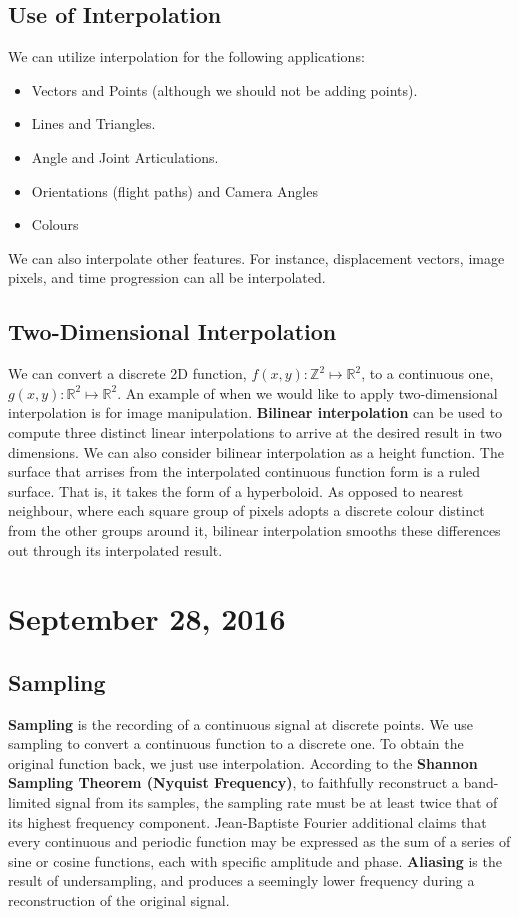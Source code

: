 \documentclass[11pt]{article}
\theoremstyle{plain} %
\theoremstyle{definition}
\theoremstyle{example}
\theoremstyle{remark}
\begin{document}
\subsection{Use of Interpolation}

We can utilize interpolation for the following applications:

\begin{itemize}
	\item Vectors and Points (although we should not be adding points).
	\item Lines and Triangles.
	\item Angle and Joint Articulations.
	\item Orientations (flight paths) and Camera Angles
	\item Colours
\end{itemize}

We can also interpolate other features. For instance, displacement vectors, image pixels, and time progression can all be interpolated. 

\subsection{Two-Dimensional Interpolation}

We can convert a discrete 2D function, $f(x,y):\mathbb Z^2 \mapsto \mathbb R^2$, to a continuous one, $g(x,y):\mathbb R^2 \mapsto \mathbb R^2$. An example of when we would like to apply two-dimensional interpolation is for image manipulation. \textbf{Bilinear interpolation} can be used to compute three distinct linear interpolations to arrive at the desired result in two dimensions. We can also consider bilinear interpolation as a height function. The surface that arrises from the interpolated continuous function form is a ruled surface. That is, it takes the form of a hyperboloid. As opposed to nearest neighbour, where each square group of pixels adopts a discrete colour distinct from the other groups around it, bilinear interpolation smooths these differences out through its interpolated result.

\section{September 28, 2016}
\subsection{Sampling}
\textbf{Sampling} is the recording of a continuous signal at discrete points. We use sampling to convert a continuous function to a discrete one. To obtain the original function back, we just use interpolation. According to the \textbf{Shannon Sampling Theorem (Nyquist Frequency)}, to faithfully reconstruct a band-limited signal from its samples, the sampling rate must be at least twice that of its highest frequency component. Jean-Baptiste Fourier additional claims that every continuous and periodic function may be expressed as the sum of a series of sine or cosine functions, each with specific amplitude and phase. \textbf{Aliasing} is the result of undersampling, and produces a seemingly lower frequency during a reconstruction of the original signal.
\end{document}
